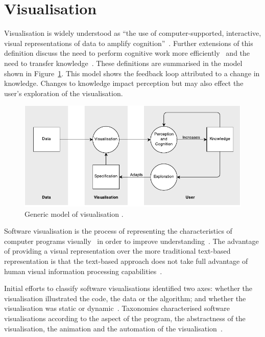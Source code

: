 \section{Visualisation}

Visualisation is widely understood as ``the use of computer-supported, interactive, visual representations of data to amplify cognition''~\cite{Card1999}. Further extensions of this definition discuss the need to perform cognitive work more efficiently~\cite{Ware2013a} and the need to transfer knowledge~\cite{Burkhard}. These definitions are summarised in the model shown in Figure~\ref{fig:model-of-visualisation}. This model shows the feedback loop attributed to a change in knowledge. Changes to knowledge impact perception but may also effect the user's exploration of the visualisation.

\begin{figure}
  \centering \includegraphics[width=\columnwidth]{../images/diagrams/wijk-model-of-visualisation.pdf}
  \caption[Generic model of visualisation]{Generic model of visualisation \protect\cite{VanWijk2005}.}
\label{fig:model-of-visualisation}
\end{figure}

Software visualisation is the process of representing the characteristics of computer programs visually~\cite{Stasko1992} in order to improve understanding~\cite{Diehl2007}. The advantage of providing a visual representation over the more traditional text-based representation is that the text-based approach does not take full advantage of human visual information processing capabilities~\cite{Myers1989}.

Initial efforts to classify software visualisations identified two axes: whether the visualisation illustrated the code, the data or the algorithm; and whether the visualisation was static or dynamic~\cite{Myers1989}. Taxonomies characterised software visualisations according to the aspect of the program, the abstractness of the visualisation, the animation and the automation of the visualisation~\cite{Stasko1992}.

